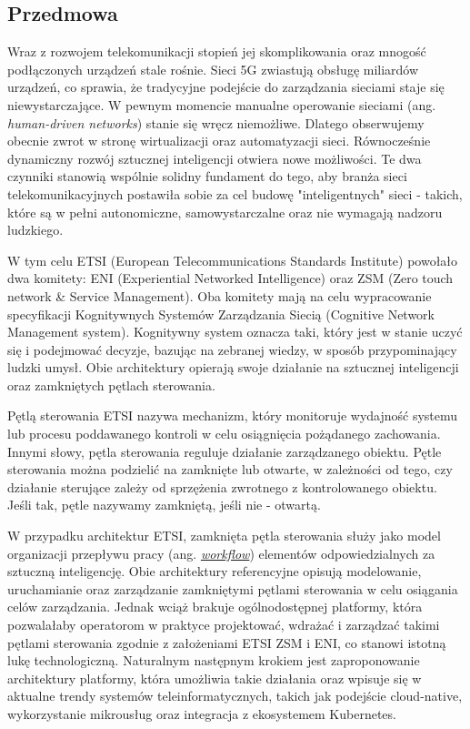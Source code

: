 \subsection{Przedmowa}

Wraz z rozwojem telekomunikacji stopień jej skomplikowania oraz mnogość podłączonych urządzeń stale rośnie. Sieci 5G zwiastują obsługę miliardów urządzeń, co sprawia, że tradycyjne podejście do zarządzania sieciami staje się niewystarczające. W pewnym momencie manualne operowanie sieciami (ang. \textit{human-driven networks}) stanie się wręcz niemożliwe. Dlatego obserwujemy obecnie zwrot w stronę wirtualizacji oraz automatyzacji sieci. Równocześnie dynamiczny rozwój sztucznej inteligencji otwiera nowe możliwości. Te dwa czynniki stanowią wspólnie solidny fundament do tego, aby branża sieci telekomunikacyjnych postawiła sobie za cel budowę "inteligentnych" sieci - takich, które są w pełni autonomiczne, samowystarczalne oraz nie wymagają nadzoru ludzkiego.

W tym celu ETSI (European Telecommunications Standards Institute) powołało dwa komitety: ENI (Experiential Networked Intelligence) oraz ZSM (Zero touch network \& Service Management). Oba komitety mają na celu wypracowanie specyfikacji Kognitywnych Systemów Zarządzania Siecią (Cognitive Network Management system). Kognitywny system oznacza taki, który jest w stanie uczyć się i podejmować decyzje, bazując na zebranej wiedzy, w sposób przypominający ludzki umysł. Obie architektury opierają swoje działanie na sztucznej inteligencji oraz zamkniętych pętlach sterowania. 

Pętlą sterowania ETSI nazywa mechanizm, który monitoruje wydajność systemu lub procesu poddawanego kontroli w celu osiągnięcia pożądanego zachowania. Innymi słowy, pętla sterowania reguluje działanie zarządzanego obiektu. Pętle sterowania można podzielić na zamknięte lub otwarte, w zależności od tego, czy działanie sterujące zależy od sprzężenia zwrotnego z kontrolowanego obiektu. Jeśli tak, pętle nazywamy zamkniętą, jeśli nie - otwartą. 

W przypadku architektur ETSI, zamknięta pętla sterowania służy jako model organizacji przepływu pracy (ang. \hyperlink{def:workflow}{\textit{workflow}}) elementów odpowiedzialnych za sztuczną inteligencję. Obie architektury referencyjne opisują modelowanie, uruchamianie oraz zarządzanie zamkniętymi pętlami sterowania w celu osiągania celów zarządzania. Jednak wciąż brakuje ogólnodostępnej platformy, która pozwalałaby operatorom w praktyce projektować, wdrażać i zarządzać takimi pętlami sterowania zgodnie z założeniami ETSI ZSM i ENI, co stanowi istotną lukę technologiczną. Naturalnym następnym krokiem jest zaproponowanie architektury platformy, która umożliwia takie działania oraz wpisuje się w aktualne trendy systemów teleinformatycznych, takich jak podejście cloud-native, wykorzystanie mikrousług oraz integracja z ekosystemem Kubernetes.

